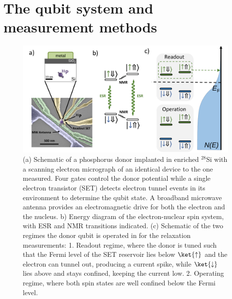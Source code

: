 \section{\label{sec:background} The qubit system and measurement methods}

\begin{figure}
\centering
\includegraphics[width=\columnwidth]{figures/fig1.pdf}
\caption{
(a) Schematic of a phosphorus donor implanted in enriched $^{28}$Si with a scanning electron micrograph of an identical device to the one measured. Four gates control the donor potential while a single electron transistor (SET) detects electron tunnel events in its environment to determine the qubit state. A broadband microwave antenna provides an electromagnetic drive for both the electron and the nucleus. b) Energy diagram of the electron-nuclear spin system, with ESR and NMR transitions indicated. (c) Schematic of the two regimes the donor qubit is operated in for the relaxation measurements: 1. Readout regime, where the donor is tuned such that the Fermi level of the SET reservoir lies below $\ket{\uparrow}$ and the electron can tunnel out, producing a current spike, while $\ket{\downarrow}$ lies above and stays confined, keeping the current low. 2. Operating regime, where both spin states are well confined below the Fermi level.
}
\label{fig:device}
\end{figure}


